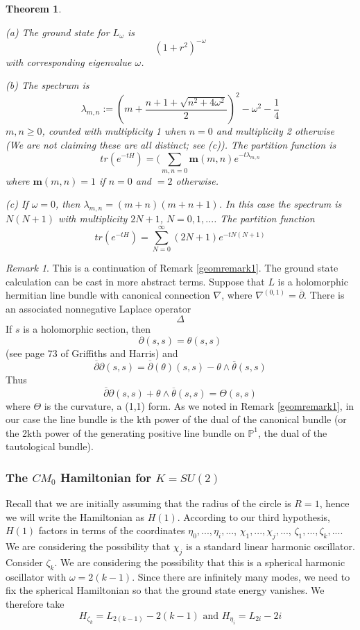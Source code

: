 \documentclass{amsart}
\newtheorem{theorem}{Theorem}[section]
\theoremstyle{conjecture}
\theoremstyle{definition}
\theoremstyle{question}
\theoremstyle{questions}
\theoremstyle{remark}
\newtheorem*{remark}{Remark}
\theoremstyle{remarks}
\theoremstyle{example}
\numberwithin{equation}{section}
\begin{document}
\begin{theorem}\label{spectrum}

(a) The ground state for $L_{\omega}$ is
$$(1+r^2)^{-\omega}$$
with corresponding eigenvalue $\omega$.

(b) The spectrum is 
$$\lambda_{m,n}:=(m+\frac{n+1+\sqrt{n^2+4\omega^2}}{2})^2-\omega^2-\frac 14$$
$m,n\ge 0$, counted with multiplicity 1 when $n=0$ and multiplicity 2 otherwise (We are not claiming these are all distinct; see (c)).
The partition function is
$$tr(e^{-tH})=(\sum_{m,n=0}\mathbf m(m,n)e^{-t\lambda_{m,n}}$$
where $\mathbf m(m,n)=1$ if $n=0$ and $=2$ otherwise.

(c) If $\omega=0$, then $\lambda_{m,n}=(m+n)(m+n+1)$. In this case the spectrum is $N(N+1)$ with multiplicity $2N+1$, $N=0,1,...$. The partition function
$$tr(e^{-tH})=\sum_{N=0}^{\infty}(2N+1)e^{-tN(N+1)}$$


\end{theorem}


\begin{remark}\label{abstractarg}  This is a continuation of Remark \ref{geomremark1}. The ground state calculation can be cast
in more abstract terms. Suppose that $L$ is a holomorphic hermitian line bundle with canonical connection $\nabla$, where $\nabla^{(0,1)}=\overline \partial$. There is an associated nonnegative Laplace operator
$$\Delta  $$
If $s$
is a holomorphic section, then
$$\partial (s,s)=\theta (s,s)$$
(see page 73 of Griffiths and Harris) and
$$\overline {\partial}\partial (s,s)= \overline \partial (\theta) (s,s)-\theta \wedge \overline \theta (s,s)$$
Thus
$$\overline {\partial}\partial (s,s)+\theta \wedge \overline \theta (s,s)=\Theta (s,s)$$
where $\Theta$ is the curvature, a (1,1) form.
As we noted in Remark \ref{geomremark1}, in our case the line bundle is the kth power of the dual of the canonical bundle (or the 2kth power
of the generating positive line bundle on $\mathbb P^1$, the dual of the tautological bundle).

\end{remark}


\subsubsection{The $CM_0$ Hamiltonian for $K=SU(2)$}

Recall that we are initially assuming that the radius of the circle is $R=1$, hence we will write the Hamiltonian
as $H(1)$. According to our third hypothesis, $H(1)$ factors in terms of the coordinates $\eta_0,...,\eta_i,...$, $\chi_1,...,\chi_j,...$,
$\zeta_1,...,\zeta_k,...$. We are considering the possibility that $\chi_j$ is a standard linear harmonic oscillator. Consider
$\zeta_k$. We are considering the possibility that this is a spherical harmonic oscillator with $\omega=2(k-1)$.
Since there are infinitely many modes, we need to fix the spherical Hamiltonian so that the ground state energy vanishes. We therefore take
$$H_{\zeta_k}=L_{2(k-1)}-2(k-1) \text{  and  } H_{\eta_i}=L_{2i}-2i$$
\end{document}
